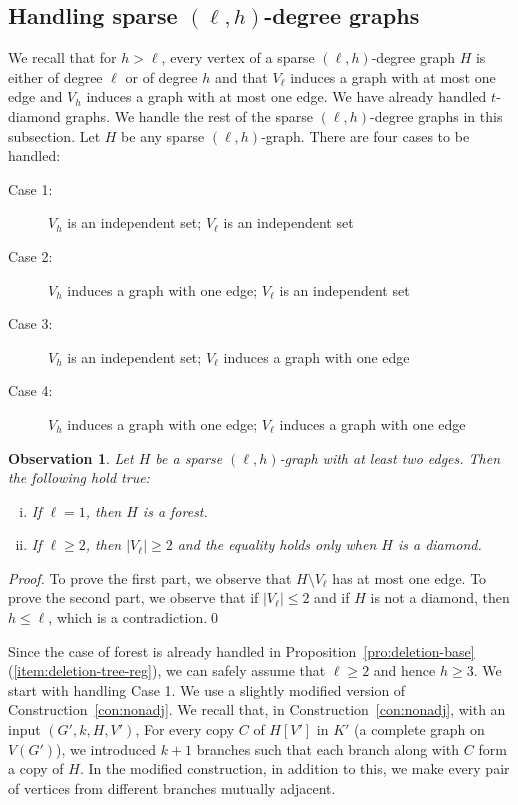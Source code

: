 \documentclass[envcountsame,envcountsect,10pt,oribibl]{llncs}
\newtheorem{observation}[lemma]{Observation}
\begin{document}
\subsection{Handling sparse $(\ell,h)$-degree graphs}
\label{sec:sparselh}

We recall that for $h>\ell$, 
every vertex of a sparse $(\ell, h)$-degree graph $H$ is either of degree $\ell$
or of degree $h$ and that $V_{\ell}$ induces a graph with at most one edge and $V_h$
induces a graph with at most one edge. We have already handled $t$-diamond graphs.
We handle the rest of the sparse $(\ell,h)$-degree graphs in this subsection.
Let $H$ be any sparse $(\ell,h)$-graph.
There are four cases to be handled:
\begin{description}
\item[Case 1:] $V_{h}$ is an independent set; $V_{\ell}$ is an independent set
\item[Case 2:] $V_{h}$ induces a graph with one edge; $V_{\ell}$ is an independent set
\item[Case 3:] $V_{h}$ is an independent set; $V_{\ell}$ induces a graph with one edge
\item[Case 4:] $V_{h}$ induces a graph with one edge; $V_{\ell}$ induces a graph with one edge
\end{description}

\begin{observation}
  \label{obs:sparselh}
  Let $H$ be a sparse $(\ell,h)$-graph with at least two edges. Then the following hold true:
  \begin{enumerate}[(i)]
  \item\label{item:sparselh-1} If $\ell=1$, then $H$ is a forest.
  \item\label{item:sparselh-2} If $\ell\geq 2$, then $|V_{\ell}|\geq 2$ and the equality holds only when $H$ is a diamond.
  \end{enumerate}
\end{observation}
\begin{proof}
  To prove the first part, we observe that $H\setminus V_{\ell}$
  has at most one edge. 
  To prove the second part, we observe that if $|V_{\ell}|\leq 2$ and if $H$ is not a diamond, then $h\leq \ell$,
  which is a contradiction.\qed
\end{proof}

Since the case of forest is already handled in Proposition~\ref{pro:deletion-base}(\ref{item:deletion-tree-reg}),
we can safely assume that $\ell\geq 2$ and hence $h\geq 3$.
We start with handling Case 1.
We use a slightly modified 
version of Construction~\ref{con:nonadj}. 
We recall that, in Construction~\ref{con:nonadj}, with an input $(G',k,H,V')$,
For every copy $C$ of $H[V']$ in $K'$ (a complete graph on $V(G')$), we introduced $k+1$ branches such that
each branch along with $C$ form a copy of $H$. 
In the modified
construction, in addition to this, we make every pair of vertices from different branches mutually adjacent.
\end{document}
